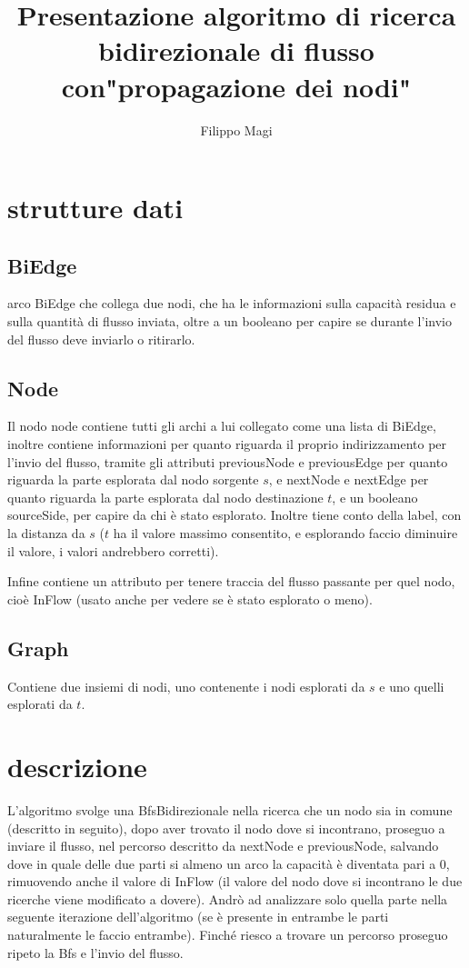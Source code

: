 \documentclass{article}
\title{Presentazione algoritmo di ricerca bidirezionale di flusso con"propagazione dei nodi"}
\author{Filippo Magi }
\begin{document}
\maketitle

\section{strutture dati}

\subsection{ BiEdge}

arco BiEdge che collega due nodi, che ha le informazioni sulla capacità residua e sulla quantità di flusso inviata, oltre a un booleano per capire se durante l'invio del flusso deve inviarlo o ritirarlo.

\subsection{Node}

Il nodo node contiene tutti gli archi a lui collegato come una lista di BiEdge, inoltre contiene informazioni per quanto riguarda il proprio indirizzamento per l'invio del flusso, tramite gli attributi previousNode e previousEdge per quanto riguarda la parte esplorata dal nodo sorgente $s$, e nextNode e nextEdge per quanto riguarda la parte esplorata dal nodo destinazione $t$, e un booleano sourceSide, per capire da chi è stato esplorato.
Inoltre tiene conto della label, con la distanza da $s$ ($t$ ha il valore massimo consentito, e esplorando faccio diminuire il valore, i valori andrebbero corretti).

Infine contiene un attributo per tenere traccia del flusso passante per quel nodo, cioè InFlow (usato anche per vedere se è stato esplorato o meno).

\subsection{Graph}

Contiene due insiemi di nodi, uno contenente i nodi esplorati da $s$ e uno quelli esplorati da $t$.

\section{descrizione}

L'algoritmo svolge una BfsBidirezionale nella ricerca che un nodo sia in comune (descritto in seguito),
dopo aver trovato il nodo dove si incontrano, proseguo a inviare il flusso, nel percorso descritto da nextNode e previousNode, salvando dove in quale delle due parti si almeno un arco la capacità è diventata pari a 0, rimuovendo anche il valore di InFlow (il valore del nodo dove si incontrano le due ricerche viene modificato a dovere).
Andrò ad analizzare solo quella parte nella seguente iterazione dell'algoritmo (se è presente in entrambe le parti naturalmente le faccio entrambe).
Finché riesco a trovare un percorso proseguo ripeto la Bfs e l'invio del flusso.
\end{document}
